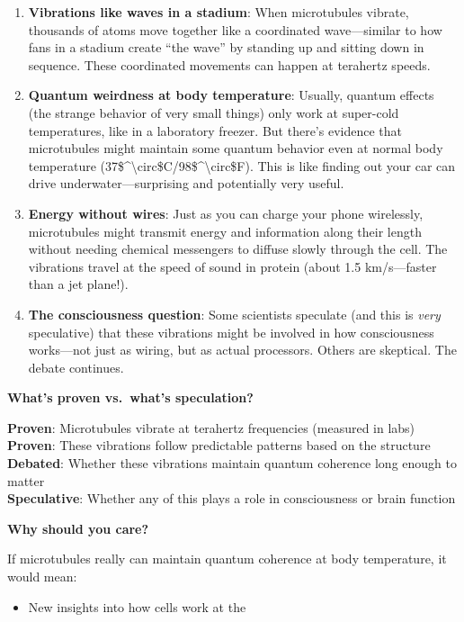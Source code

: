 \begin{enumerate}
\def\labelenumi{\arabic{enumi}.}
\item
  \textbf{Vibrations like waves in a stadium}: When microtubules
  vibrate, thousands of atoms move together like a coordinated
  wave---similar to how fans in a stadium create ``the wave'' by
  standing up and sitting down in sequence. These coordinated movements
  can happen at terahertz speeds.
\item
  \textbf{Quantum weirdness at body temperature}: Usually, quantum
  effects (the strange behavior of very small things) only work at
  super-cold temperatures, like in a laboratory freezer. But
  there's evidence that microtubules might maintain some
  quantum behavior even at normal body temperature
  (37\$\^{}\textbackslash circ\$C/98\$\^{}\textbackslash circ\$F). This
  is like finding out your car can drive underwater---surprising and
  potentially very useful.
\item
  \textbf{Energy without wires}: Just as you can charge your phone
  wirelessly, microtubules might transmit energy and information along
  their length without needing chemical messengers to diffuse slowly
  through the cell. The vibrations travel at the speed of sound in
  protein (about 1.5 km/s---faster than a jet plane!).
\item
  \textbf{The consciousness question}: Some scientists speculate (and
  this is \emph{very} speculative) that these vibrations might be
  involved in how consciousness works---not just as wiring, but as
  actual processors. Others are skeptical. The debate continues.
\end{enumerate}

\textbf{What's proven vs.~what's
speculation?}

\textbf{Proven}: Microtubules vibrate at terahertz frequencies (measured
in labs)\\
\textbf{Proven}: These vibrations follow predictable patterns based on
the structure\\
\textbf{Debated}: Whether these vibrations maintain quantum coherence
long enough to matter\\
\textbf{Speculative}: Whether any of this plays a role in consciousness
or brain function

\textbf{Why should you care?}

If microtubules really can maintain quantum coherence at body
temperature, it would mean:
\begin{itemize}
\item New insights into how cells work at the
\end{itemize}

